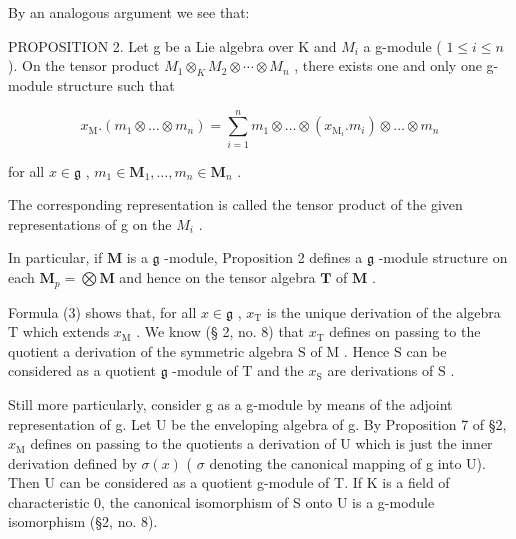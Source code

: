 By an analogous argument we see that:

PROPOSITION 2. Let g be a Lie algebra over K and \(M_{i}\) a g-module ( \(1 \leqslant i \leqslant n\) ). On the tensor product \(M_{1} \otimes_{K} M_{2} \otimes \cdots \otimes M_{n}\) , there exists one and only one g-module structure such that

\[
x _ {\mathrm{M}}. (m _ {1} \otimes \dots \otimes m _ {n}) = \sum_ {i = 1} ^ {n} m _ {1} \otimes \dots \otimes (x _ {\mathrm{M} _ {i}}. m _ {i}) \otimes \dots \otimes m _ {n}\tag{3}
\]

for all \(x \in \mathfrak{g}\) , \(m_1 \in \mathbf{M}_1, \ldots, m_n \in \mathbf{M}_n\) .

The corresponding representation is called the tensor product of the given representations of g on the \(M_{i}\) .

In particular, if \(\mathbf{M}\) is a \(\mathfrak{g}\) -module, Proposition 2 defines a \(\mathfrak{g}\) -module structure
on each \(\mathbf{M}_p = \bigotimes \mathbf{M}\) and hence on the tensor algebra \(\mathbf{T}\) of \(\mathbf{M}\) .

Formula (3) shows that, for all \(x \in \mathfrak{g}\) , \(x_{\mathrm{T}}\) is the unique derivation of the algebra \(\mathrm{T}\) which extends \(x_{\mathrm{M}}\) . We know (§ 2, no. 8) that \(x_{\mathrm{T}}\) defines on passing to the quotient a derivation of the symmetric algebra \(\mathrm{S}\) of \(\mathrm{M}\) . Hence \(\mathrm{S}\) can be considered as a quotient \(\mathfrak{g}\) -module of \(\mathrm{T}\) and the \(x_{\mathrm{S}}\) are derivations of \(\mathrm{S}\) .

Still more particularly, consider g as a g-module by means of the adjoint representation of g. Let U be the enveloping algebra of g. By Proposition 7 of §2, \(x_{\mathrm{M}}\) defines on passing to the quotients a derivation of U which is just the inner derivation defined by \(\sigma(x)\) ( \(\sigma\) denoting the canonical mapping of g into U). Then U can be considered as a quotient g-module of T. If K is a field of characteristic 0, the canonical isomorphism of S onto U is a g-module isomorphism (§2, no. 8).

